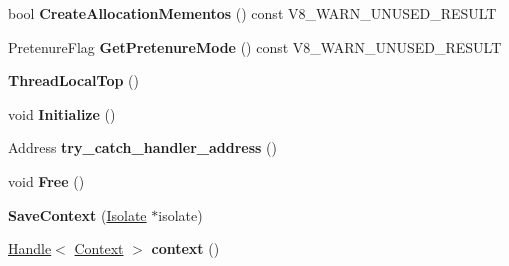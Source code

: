 \begin{DoxyCompactItemize}
\item 
\hypertarget{classv8_1_1internal_1_1_b_a_s_e___e_m_b_e_d_d_e_d_a6adbd51fede50633c5325ca59f6d1510}{}bool {\bfseries Create\+Allocation\+Mementos} () const V8\+\_\+\+W\+A\+R\+N\+\_\+\+U\+N\+U\+S\+E\+D\+\_\+\+R\+E\+S\+U\+L\+T\label{classv8_1_1internal_1_1_b_a_s_e___e_m_b_e_d_d_e_d_a6adbd51fede50633c5325ca59f6d1510}

\item 
\hypertarget{classv8_1_1internal_1_1_b_a_s_e___e_m_b_e_d_d_e_d_a54f40f76e3e136763781cf35722ba455}{}Pretenure\+Flag {\bfseries Get\+Pretenure\+Mode} () const V8\+\_\+\+W\+A\+R\+N\+\_\+\+U\+N\+U\+S\+E\+D\+\_\+\+R\+E\+S\+U\+L\+T\label{classv8_1_1internal_1_1_b_a_s_e___e_m_b_e_d_d_e_d_a54f40f76e3e136763781cf35722ba455}

\item 
\hypertarget{classv8_1_1internal_1_1_b_a_s_e___e_m_b_e_d_d_e_d_af7535d5c0d3f68e799c52730190ba2d9}{}{\bfseries Thread\+Local\+Top} ()\label{classv8_1_1internal_1_1_b_a_s_e___e_m_b_e_d_d_e_d_af7535d5c0d3f68e799c52730190ba2d9}

\item 
\hypertarget{classv8_1_1internal_1_1_b_a_s_e___e_m_b_e_d_d_e_d_aef7e9906a6ec8528d66c9d4eaab943a9}{}void {\bfseries Initialize} ()\label{classv8_1_1internal_1_1_b_a_s_e___e_m_b_e_d_d_e_d_aef7e9906a6ec8528d66c9d4eaab943a9}

\item 
\hypertarget{classv8_1_1internal_1_1_b_a_s_e___e_m_b_e_d_d_e_d_ac9a7877f5d882c025cecc03e7f195b64}{}Address {\bfseries try\+\_\+catch\+\_\+handler\+\_\+address} ()\label{classv8_1_1internal_1_1_b_a_s_e___e_m_b_e_d_d_e_d_ac9a7877f5d882c025cecc03e7f195b64}

\item 
\hypertarget{classv8_1_1internal_1_1_b_a_s_e___e_m_b_e_d_d_e_d_a1d46a228244fa7ca2055dffcc3983f63}{}void {\bfseries Free} ()\label{classv8_1_1internal_1_1_b_a_s_e___e_m_b_e_d_d_e_d_a1d46a228244fa7ca2055dffcc3983f63}

\item 
\hypertarget{classv8_1_1internal_1_1_b_a_s_e___e_m_b_e_d_d_e_d_aa387fc50f5339e3ff87cb8ff43ab531e}{}{\bfseries Save\+Context} (\hyperlink{classv8_1_1internal_1_1_isolate}{Isolate} $\ast$isolate)\label{classv8_1_1internal_1_1_b_a_s_e___e_m_b_e_d_d_e_d_aa387fc50f5339e3ff87cb8ff43ab531e}

\item 
\hypertarget{classv8_1_1internal_1_1_b_a_s_e___e_m_b_e_d_d_e_d_af1a974f385979f7fa48292bf3379cc17}{}\hyperlink{classv8_1_1internal_1_1_handle}{Handle}$<$ \hyperlink{classv8_1_1internal_1_1_context}{Context} $>$ {\bfseries context} ()\label{classv8_1_1internal_1_1_b_a_s_e___e_m_b_e_d_d_e_d_af1a974f385979f7fa48292bf3379cc17}


\end{DoxyCompactItemize}
